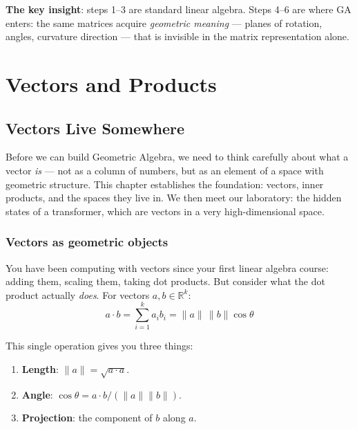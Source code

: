 \documentclass[11pt, twoside, openright]{memoir}
\newcommand{\ip}{\cdot}           %
\begin{document}
\vspace{0.5em}
\noindent
\textbf{The key insight}: steps 1--3 are standard linear algebra.
Steps 4--6 are where GA enters: the same matrices acquire
\emph{geometric meaning} --- planes of rotation, angles, curvature
direction --- that is invisible in the matrix representation alone.

\clearpage

\part{Vectors and Products}
\label{part:foundations}


\chapter{Vectors Live Somewhere}
\label{chap:vectors}

\begin{whycare}
Before we can build Geometric Algebra, we need to think carefully about
what a vector \emph{is} --- not as a column of numbers, but as an element
of a space with geometric structure.  This chapter establishes the
foundation: vectors, inner products, and the spaces they live in.  We
then meet our laboratory: the hidden states of a transformer, which are
vectors in a very high-dimensional space.
\end{whycare}

\section{Vectors as geometric objects}

You have been computing with vectors since your first linear algebra
course: adding them, scaling them, taking dot products.  But consider
what the dot product actually \emph{does}.  For vectors
$a, b \in \mathbb{R}^k$:
\[
  a \ip b = \sum_{i=1}^{k} a_i b_i = \|a\| \, \|b\| \cos\theta
\]

This single operation gives you three things:
\begin{enumerate}[nosep]
\item \textbf{Length}: $\|a\| = \sqrt{a \ip a}$.
\item \textbf{Angle}: $\cos\theta = a \ip b / (\|a\| \|b\|)$.
\item \textbf{Projection}: the component of $b$ along $a$.
\end{enumerate}
\end{document}
